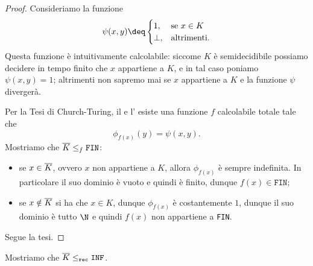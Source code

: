 \begin{proof}
    Consideriamo la funzione \[
        \psi(x, y) \deq \begin{cases}
            1, &\text{se } x \in K\\
            \bot, &\text{altrimenti.}
        \end{cases}
    \] Questa funzione è intuitivamente calcolabile: siccome $K$ è semidecidibile possiamo decidere in tempo finito che $x$ appartiene a $K$, e in tal caso poniamo $\psi(x, y) = 1$; altrimenti non sapremo mai se $x$ appartiene a $K$ e la funzione $\psi$ divergerà.
    
    Per la Tesi di Church-Turing, il  e l' esiste una funzione $f$ calcolabile totale tale che \[
        \phi_{f(x)}(y) = \psi(x, y).
    \] Mostriamo che $\overline{K} \leq_f \texttt{FIN}$: \begin{itemize}
        \item se $x \in \overline{K}$, ovvero $x$ non appartiene a $K$, allora $\phi_{f(x)}$ è sempre indefinita. In particolare il suo dominio è vuoto e quindi è finito, dunque $f(x) \in \texttt{FIN}$;
        \item se $x \notin \overline{K}$ si ha che $x \in K$, dunque $\phi_{f(x)}$ è costantemente $1$, dunque il suo dominio è tutto $\N$ e quindi $f(x)$ non appartiene a \texttt{FIN}.       
    \end{itemize}
    Segue la tesi.
\end{proof}

Mostriamo che $\overline{K} \leq_{\texttt{rec}} \texttt{INF}$.

